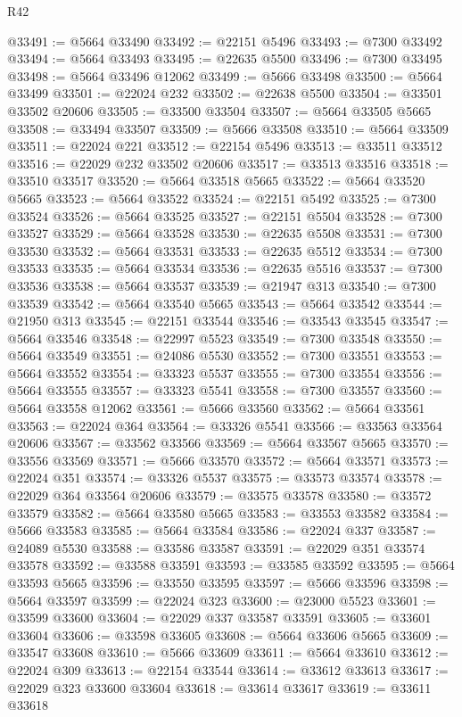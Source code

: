 \begin{lexlean}{R42}
\begin{coremodule}
@33491 := @5664 @33490
@33492 := @22151 @5496
@33493 := @7300 @33492
@33494 := @5664 @33493
@33495 := @22635 @5500
@33496 := @7300 @33495
@33498 := @5664 @33496 @12062
@33499 := @5666 @33498
@33500 := @5664 @33499
@33501 := @22024 @232
@33502 := @22638 @5500
@33504 := @33501 @33502 @20606
@33505 := @33500 @33504
@33507 := @5664 @33505 @5665
@33508 := @33494 @33507
@33509 := @5666 @33508
@33510 := @5664 @33509
@33511 := @22024 @221
@33512 := @22154 @5496
@33513 := @33511 @33512
@33516 := @22029 @232 @33502 @20606
@33517 := @33513 @33516
@33518 := @33510 @33517
@33520 := @5664 @33518 @5665
@33522 := @5664 @33520 @5665
@33523 := @5664 @33522
@33524 := @22151 @5492
@33525 := @7300 @33524
@33526 := @5664 @33525
@33527 := @22151 @5504
@33528 := @7300 @33527
@33529 := @5664 @33528
@33530 := @22635 @5508
@33531 := @7300 @33530
@33532 := @5664 @33531
@33533 := @22635 @5512
@33534 := @7300 @33533
@33535 := @5664 @33534
@33536 := @22635 @5516
@33537 := @7300 @33536
@33538 := @5664 @33537
@33539 := @21947 @313
@33540 := @7300 @33539
@33542 := @5664 @33540 @5665
@33543 := @5664 @33542
@33544 := @21950 @313
@33545 := @22151 @33544
@33546 := @33543 @33545
@33547 := @5664 @33546
@33548 := @22997 @5523
@33549 := @7300 @33548
@33550 := @5664 @33549
@33551 := @24086 @5530
@33552 := @7300 @33551
@33553 := @5664 @33552
@33554 := @33323 @5537
@33555 := @7300 @33554
@33556 := @5664 @33555
@33557 := @33323 @5541
@33558 := @7300 @33557
@33560 := @5664 @33558 @12062
@33561 := @5666 @33560
@33562 := @5664 @33561
@33563 := @22024 @364
@33564 := @33326 @5541
@33566 := @33563 @33564 @20606
@33567 := @33562 @33566
@33569 := @5664 @33567 @5665
@33570 := @33556 @33569
@33571 := @5666 @33570
@33572 := @5664 @33571
@33573 := @22024 @351
@33574 := @33326 @5537
@33575 := @33573 @33574
@33578 := @22029 @364 @33564 @20606
@33579 := @33575 @33578
@33580 := @33572 @33579
@33582 := @5664 @33580 @5665
@33583 := @33553 @33582
@33584 := @5666 @33583
@33585 := @5664 @33584
@33586 := @22024 @337
@33587 := @24089 @5530
@33588 := @33586 @33587
@33591 := @22029 @351 @33574 @33578
@33592 := @33588 @33591
@33593 := @33585 @33592
@33595 := @5664 @33593 @5665
@33596 := @33550 @33595
@33597 := @5666 @33596
@33598 := @5664 @33597
@33599 := @22024 @323
@33600 := @23000 @5523
@33601 := @33599 @33600
@33604 := @22029 @337 @33587 @33591
@33605 := @33601 @33604
@33606 := @33598 @33605
@33608 := @5664 @33606 @5665
@33609 := @33547 @33608
@33610 := @5666 @33609
@33611 := @5664 @33610
@33612 := @22024 @309
@33613 := @22154 @33544
@33614 := @33612 @33613
@33617 := @22029 @323 @33600 @33604
@33618 := @33614 @33617
@33619 := @33611 @33618

\end{coremodule}
\end{lexlean}
